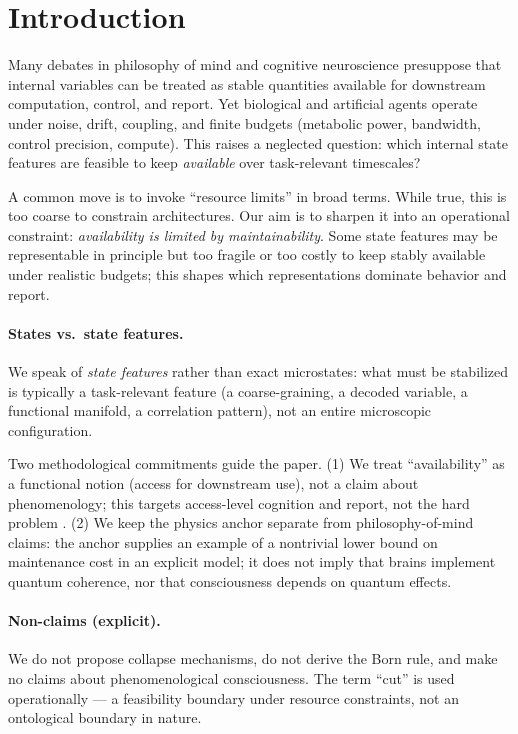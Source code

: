 \documentclass[11pt,a4paper]{article}
\begin{document}
\section{Introduction}

Many debates in philosophy of mind and cognitive neuroscience presuppose that
internal variables can be treated as stable quantities available for
downstream computation, control, and report. Yet biological and artificial
agents operate under noise, drift, coupling, and finite budgets (metabolic
power, bandwidth, control precision, compute). This raises a neglected
question: which internal state features are feasible to keep \emph{available}
over task-relevant timescales?

A common move is to invoke ``resource limits'' in broad terms. While true,
this is too coarse to constrain architectures. Our aim is to sharpen it into
an operational constraint: \emph{availability is limited by maintainability}.
Some state features may be representable in principle but too fragile or too
costly to keep stably available under realistic budgets; this shapes which
representations dominate behavior and report.

\paragraph{States vs.\ state features.} We speak of \emph{state features}
rather than exact microstates: what must be stabilized is typically a
task-relevant feature (a coarse-graining, a decoded variable, a functional
manifold, a correlation pattern), not an entire microscopic configuration.

Two methodological commitments guide the paper. (1) We treat ``availability''
as a functional notion (access for downstream use), not a claim about
phenomenology; this targets access-level cognition and report, not the hard
problem \cite{Block95,Chalmers95,Chalmers96}. (2) We keep the physics anchor
separate from philosophy-of-mind claims: the anchor supplies an example of a
nontrivial lower bound on maintenance cost in an explicit model; it does not
imply that brains implement quantum coherence, nor that consciousness depends
on quantum effects.

\paragraph{Non-claims (explicit).} We do not propose collapse mechanisms, do
not derive the Born rule, and make no claims about phenomenological
consciousness. The term ``cut'' is used operationally --- a feasibility
boundary under resource constraints, not an ontological boundary in nature.
\end{document}
